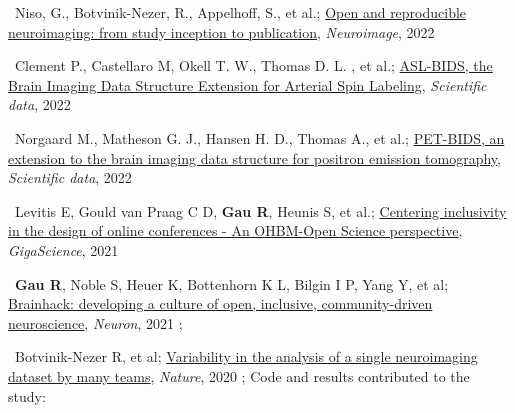 


\textbullet~Niso, G., Botvinik-Nezer, R., Appelhoff, S., et al.;
\href{https://doi.org/10.1016/j.neuroimage.2022.119623}
{Open and reproducible neuroimaging: from study inception to publication},
\textit{Neuroimage},
2022
\newline
{}


\textbullet~Clement P., Castellaro M, Okell T. W., Thomas D. L. , et al.;
\href{https://doi.org/10.1038/s41597-022-01615-9}
{ASL-BIDS, the Brain Imaging Data Structure Extension for Arterial Spin Labeling},
\textit{Scientific data},
2022
\newline
{}

\textbullet~Norgaard M., Matheson G. J., Hansen H. D., Thomas A., et al.;
\href{https://doi.org/10.1038/s41597-022-01164-1}
{PET-BIDS, an extension to the brain imaging data structure for positron emission tomography},
\textit{Scientific data},
2022
\newline
{}

\textbullet~Levitis E, Gould van Praag C D, \textbf{Gau R}, Heunis S, et al.;
\href{https://doi.org/10.1093/gigascience/giab051}
{Centering inclusivity in the design of online conferences - An OHBM-Open Science perspective},
\textit{GigaScience},
2021
\newline
{}

\textbullet~\textbf{Gau R}, Noble S, Heuer K, Bottenhorn K L, Bilgin I P, Yang Y, et al;
\href{https://doi.org/10.1016/j.neuron.2021.04.001}{Brainhack: developing a culture of open, inclusive, community-driven neuroscience},
\textit{Neuron},
2021
\newline
{};

\textbullet~Botvinik-Nezer R, et al;
\href{https://osf.io/zac8t/}{Variability in the analysis of a single neuroimaging dataset by many teams},
\textit{Nature},
2020
\newline
{};
Code and results contributed to the study:

